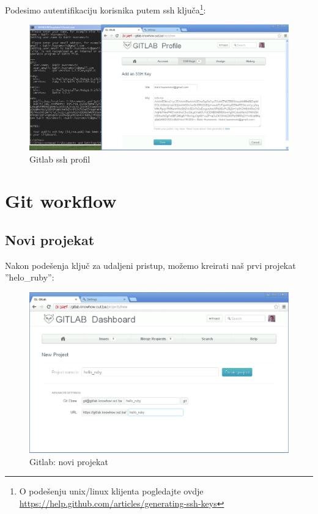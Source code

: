 \documentclass[times, utf8, seminar]{fit}
\begin{document}
Podesimo autentifikaciju korisnika putem ssh ključa\footnote{O podešenju unix/linux klijenta pogledajte ovdje \url{https://help.github.com/articles/generating-ssh-keys}}:

\begin{figure}[H]
\centering
\includegraphics[width=15cm]{img/gitlab_ssh_profile.png}
\caption{Gitlab ssh profil}
\end{figure}

\section{Git workflow}

\subsection{Novi projekat}

Nakon podešenja ključ za udaljeni pristup, možemo kreirati naš prvi projekat ''helo\_ruby'':

\begin{figure}[H]
\centering
\includegraphics[width=15cm]{img/gitlab_new_project.png}
\caption{Gitlab: novi projekat}
\end{figure}
\end{document}
